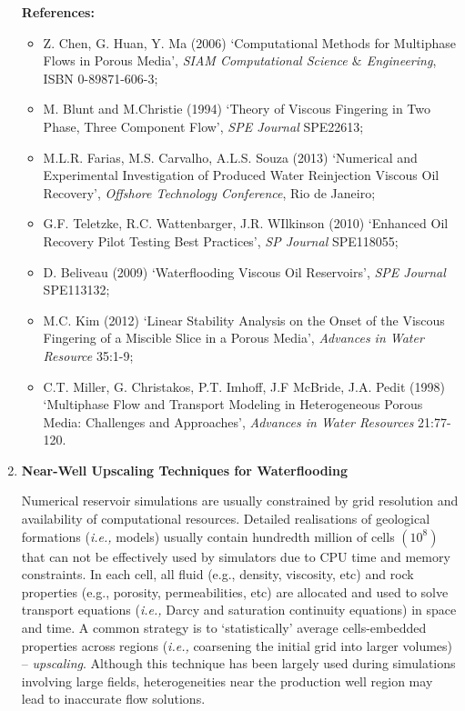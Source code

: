 \documentclass[12pts,a4paper,amsmath,amssymb,floatfix]{article}%
\newcommand{\ie}{{\it i.e., }}
\begin{document}
\begin{enumerate}[label=\bfseries Project: \arabic*:]
\noindent
{\bf References:}
\begin{itemize}
\item Z. Chen, G. Huan, Y. Ma (2006) `Computational Methods for Multiphase Flows in Porous Media', {\it SIAM Computational Science $\&$ Engineering}, ISBN 0-89871-606-3;
\item M. Blunt and M.Christie (1994) `Theory of Viscous Fingering in Two Phase, Three Component Flow', {\it SPE Journal} SPE22613;
\item M.L.R. Farias, M.S. Carvalho, A.L.S. Souza (2013) `Numerical and Experimental Investigation of Produced Water Reinjection Viscous Oil Recovery', {\it Offshore Technology Conference}, Rio de Janeiro;
\item G.F. Teletzke, R.C. Wattenbarger, J.R. WIlkinson (2010) `Enhanced Oil Recovery Pilot Testing Best Practices', {\it SP Journal} SPE118055;
\item D. Beliveau (2009) `Waterflooding Viscous Oil Reservoirs', {\it SPE Journal} SPE113132;
\item M.C. Kim (2012) `Linear Stability Analysis on the Onset of the Viscous Fingering of a Miscible Slice in a Porous Media', {\it Advances in Water Resource} 35:1-9;%
\item C.T. Miller, G. Christakos, P.T. Imhoff, J.F McBride, J.A. Pedit (1998) `Multiphase Flow and Transport Modeling in Heterogeneous Porous Media: Challenges and Approaches', {\it Advances in Water Resources} 21:77-120.
\end{itemize}

\clearpage


\item {\bf Near-Well Upscaling Techniques for Waterflooding}

Numerical reservoir simulations are usually constrained by grid resolution and availability of computational resources. Detailed realisations of geological formations (\ie models) usually contain hundredth million of cells $\left(\text{10}^{8}\right)$ that can not be effectively used by simulators due to CPU time and memory constraints.  In each cell, all fluid (e.g., density, viscosity, etc) and rock properties (e.g., porosity, permeabilities, etc) are allocated and used to solve transport equations (\ie Darcy and saturation continuity equations) in space and time. A common strategy is to `statistically' average cells-embedded properties across regions (\ie coarsening the initial grid into larger volumes) -- {\it upscaling}.  Although this technique has been largely used during simulations involving large fields, heterogeneities near the production well region may lead to inaccurate flow solutions. 



\end{enumerate}
\end{document}
